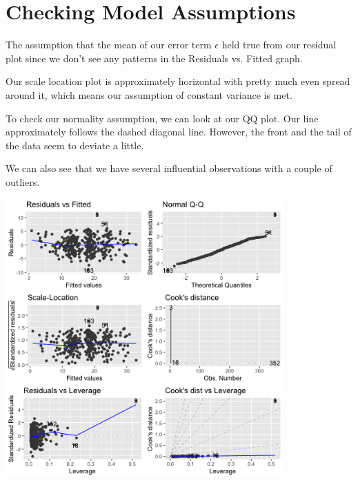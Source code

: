 \documentclass{article}
\begin{document}
\section{Checking Model Assumptions}

The assumption that the mean of our error term $\epsilon$ held true from our residual plot since we don't see any patterns in the Residuals vs. Fitted graph.

Our scale location plot is approximately horizontal with pretty much even spread around it, which means our assumption of constant variance is met. 

To check our normality assumption, we can look at our QQ plot. Our line approximately follows the dashed diagonal line. However, the front and the tail of the data seem to deviate a little. 

We can also see that we have several influential observations with a couple of outliers. 

\includegraphics[width=0.8\textwidth]{Figures/model_assumptions.png}\\
\end{document}
